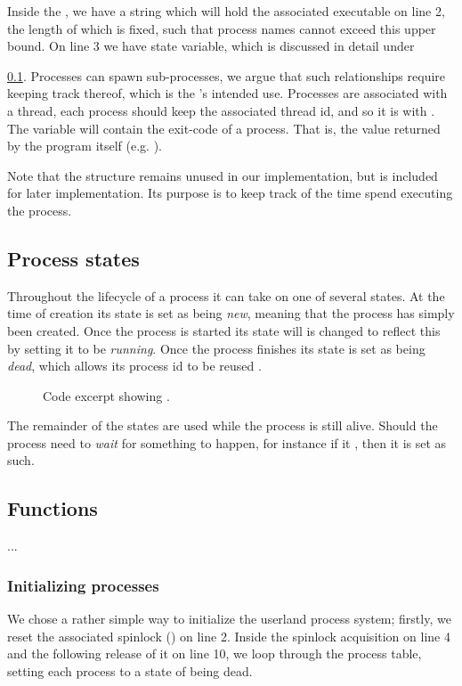 Inside the , we have a string which will hold
the associated executable on line 2, the length of which is fixed, such that
process names cannot exceed this upper bound. On line 3 we have state
variable, which is discussed in detail under
{\ref{sec:types|sub:process-states}. Processes can spawn sub-processes, we
argue that such relationships require keeping track thereof, which is the
's intended use. Processes are associated with a thread, each
process should keep the associated thread id, and so it is with
. The  variable will contain the exit-code of a
process. That is, the value returned by the program itself (e.g. ).

Note that the  structure remains unused in our implementation, but
is included for later implementation. Its purpose is to keep track of the time
spend executing the process.

\subsection{Process states}
\label{sec:types|sub:process-states}
Throughout the lifecycle of a process it can take on one of several states.
At the time of creation  its state is set
as being {\it new}, meaning that the process has simply been created. Once the
process is started  its state will is changed to
reflect this by setting it to be {\it running}. Once the process finishes its
state is set as being {\it dead}, which allows its process id to be reused
.
\begin{figure}[H]
    
    \label{code:process_state_t}
    \caption{Code excerpt showing .}
\end{figure}
The remainder of the states are used while the process is still alive. Should
the process need to {\it wait} for something to happen, for instance if it
 , then it is set as such.

\newpage
\subsection{Functions}
...

\subsubsection{Initializing processes}
We chose a rather simple way to initialize the userland process system;
firstly, we reset the associated spinlock () on
line 2. Inside the spinlock acquisition on line 4 and the following release
of it on line 10, we loop through the process table, setting each process to
a state of being dead.

}
